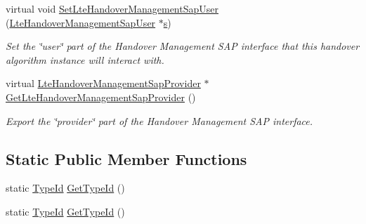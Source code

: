 \begin{DoxyCompactItemize}
\item 
virtual void \hyperlink{classns3_1_1NoOpHandoverAlgorithm_a571693f73b55e2b865adaf0a1a1ee612}{Set\+Lte\+Handover\+Management\+Sap\+User} (\hyperlink{classns3_1_1LteHandoverManagementSapUser}{Lte\+Handover\+Management\+Sap\+User} $\ast$\hyperlink{generate__test__data__lte__sinr_8m_ad83eeb3a142285d1243a08c6b7026df8}{s})
\begin{DoxyCompactList}\small\item\em Set the \char`\"{}user\char`\"{} part of the Handover Management S\+AP interface that this handover algorithm instance will interact with. \end{DoxyCompactList}\item 
virtual \hyperlink{classns3_1_1LteHandoverManagementSapProvider}{Lte\+Handover\+Management\+Sap\+Provider} $\ast$ \hyperlink{classns3_1_1NoOpHandoverAlgorithm_a0ea101bd0c3026e4a299fe4b56a48b6e}{Get\+Lte\+Handover\+Management\+Sap\+Provider} ()
\begin{DoxyCompactList}\small\item\em Export the \char`\"{}provider\char`\"{} part of the Handover Management S\+AP interface. \end{DoxyCompactList}\end{DoxyCompactItemize}
\subsection*{Static Public Member Functions}
\begin{DoxyCompactItemize}
\item 
static \hyperlink{classns3_1_1TypeId}{Type\+Id} \hyperlink{classns3_1_1NoOpHandoverAlgorithm_a3003b4762b5bec6561c6d38511208a92}{Get\+Type\+Id} ()
\item 
static \hyperlink{classns3_1_1TypeId}{Type\+Id} \hyperlink{classns3_1_1NoOpHandoverAlgorithm_a2ae81ea9b0ebe229d15a7458fecf3f8d}{Get\+Type\+Id} ()
\end{DoxyCompactItemize}
